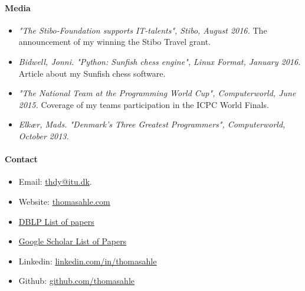 \documentclass[11pt]{article}
\begin{document}
\paragraph{Media}
\begin{itemize}
   \item[]
      \emph{"The Stibo-Foundation supports IT-talents", Stibo, August 2016.}
      The announcement of my winning the Stibo Travel grant.
   \item[]
      \emph{Bidwell, Jonni.
         "Python: Sunfish chess engine", Linux Format, January 2016.}
      Article about my Sunfish chess software.
   \item[]
      \emph{"The National Team at the Programming World Cup", Computerworld, June 2015.}
      Coverage of my teams participation in the ICPC World Finals.
   \item[]
      \emph{Elkær, Mads.
         "Denmark's Three Greatest Programmers", Computerworld, October 2013.}
      
\end{itemize}

\paragraph{Contact}
\begin{itemize}
   \item[]
      Email: \href{mailto:thdy@itu.dk}{thdy@itu.dk}.
   \item[]
      Website: \href{http://www.thomasahle.com}{\underline{thomasahle.com}}
   \item[]
      \href{https://dblp1.uni-trier.de/pers/hd/a/Ahle:Thomas_D=}{\underline{DBLP List of papers}}
   \item[]
      \href{https://scholar.google.dk/citations?user=aRiVoYgAAAAJ}{\underline{Google Scholar List of Papers}}
   \item[]
      Linkedin: \href{https://www.linkedin.com/in/thomasahle/}{\underline{linkedin.com/in/thomasahle}}
   \item[]
      Github: \href{https://github.com/thomasahle}{\underline{github.com/thomasahle}}
\end{itemize}
\end{document}
